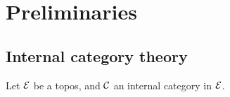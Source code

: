 \chapter*{Preliminaries}

\section{Internal category theory}

Let $\mathcal{E}$ be a topos, and $\mathcal{C}$ an internal category in $\mathcal{E}$.





